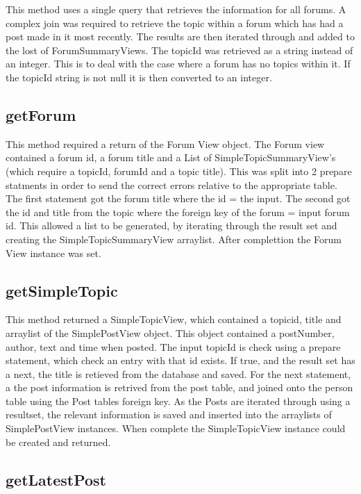 \documentclass{article}
\begin{document}
This method uses a single query that retrieves the information for all forums. A complex join was required to retrieve the topic within a forum which has had a post made in it most recently. The results are then iterated through and added to the lost of ForumSummaryViews. The topicId was retrieved as a string instead of an integer. This is to deal with the case where a forum has no topics within it. If the topicId string is not null it is then converted to an integer.

\subsection*{getForum}

This method required a return of the Forum View object. The Forum view contained a forum id, a forum title and a List of SimpleTopicSummaryView's (which require a topicId, forumId and a topic title). This was split into 2 prepare statments in order to send the correct errors relative to the appropriate table. The first statement got the forum title where the id = the input. The second got the id and title from the topic where the foreign key of the forum = input forum id. This allowed a list to be generated, by iterating through the result set and creating the SimpleTopicSummaryView arraylist. After complettion the Forum View instance was set.


\subsection*{getSimpleTopic}

This method returned a SimpleTopicView, which contained a topicid, title and arraylist of the SimplePostView object. This object contained a postNumber, author, text and time when posted. The input topicId is check using a prepare statement, which check an entry with that id exists. If true, and the result set has a next, the title is retieved from the database and saved. For the next statement, a the post information is retrived from the post table, and joined onto the person table using the Post tables foreign key. As the Posts are iterated through using a resultset, the relevant information is saved and inserted into the arraylists of SimplePostView instances. When complete the SimpleTopicView instance could be created and returned.

\subsection*{getLatestPost}
\end{document}
